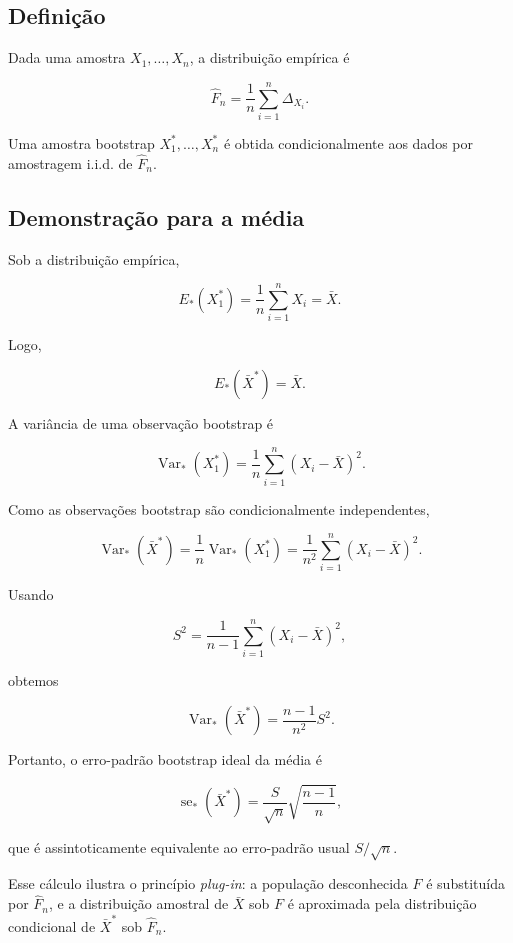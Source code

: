 \documentclass[
  letterpaper,
  DIV=11,
  numbers=noendperiod]{scrreprt}
\begin{document}

\subsection*{Definição}\label{definiuxe7uxe3o-1}

Dada uma amostra \(X_1,\ldots,X_n\), a distribuição empírica é

\[
\widehat F_n
=
\frac{1}{n}
\sum_{i=1}^n\Delta_{X_i}.
\]

Uma amostra bootstrap \(X_1^*,\ldots,X_n^*\) é obtida condicionalmente
aos dados por amostragem i.i.d. de \(\widehat F_n\).

\subsection*{Demonstração para a
média}\label{demonstrauxe7uxe3o-para-a-muxe9dia}

Sob a distribuição empírica,

\[
E_*(X_1^*)
=
\frac{1}{n}\sum_{i=1}^nX_i
=
\bar X.
\]

Logo,

\[
E_*(\bar X^*)=\bar X.
\]

A variância de uma observação bootstrap é

\[
\operatorname{Var}_*(X_1^*)
=
\frac{1}{n}
\sum_{i=1}^n(X_i-\bar X)^2.
\]

Como as observações bootstrap são condicionalmente independentes,

\[
\operatorname{Var}_*(\bar X^*)
=
\frac{1}{n}
\operatorname{Var}_*(X_1^*)
=
\frac{1}{n^2}
\sum_{i=1}^n(X_i-\bar X)^2.
\]

Usando

\[
S^2=
\frac{1}{n-1}
\sum_{i=1}^n(X_i-\bar X)^2,
\]

obtemos

\[
\operatorname{Var}_*(\bar X^*)
=
\frac{n-1}{n^2}S^2.
\]

Portanto, o erro-padrão bootstrap ideal da média é

\[
\operatorname{se}_*(\bar X^*)
=
\frac{S}{\sqrt n}
\sqrt{\frac{n-1}{n}},
\]

que é assintoticamente equivalente ao erro-padrão usual \(S/\sqrt n\).

Esse cálculo ilustra o princípio \emph{plug-in}: a população
desconhecida \(F\) é substituída por \(\widehat F_n\), e a distribuição
amostral de \(\bar X\) sob \(F\) é aproximada pela distribuição
condicional de \(\bar X^*\) sob \(\widehat F_n\).
\end{document}
